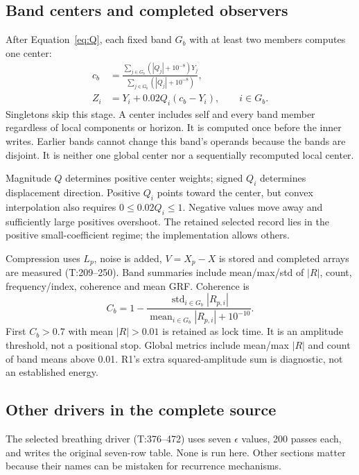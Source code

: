 \documentclass[11pt,a4paper]{article}
\newcommand{\src}[2]{\textsf{#1:#2}}
\newcommand{\mean}{\operatorname{mean}}
\newcommand{\sd}{\operatorname{std}}
\begin{document}
\subsection{Band centers and completed observers}
After Equation~\eqref{eq:Q}, each fixed band \(G_b\) with at least two members computes one center:
\begin{align}
c_b&=\frac{\sum_{j\in G_b}(|Q_j|+10^{-8})Y_j}
          {\sum_{j\in G_b}(|Q_j|+10^{-8})},\label{eq:Tcenter}\\
Z_i&=Y_i+0.02Q_i(c_b-Y_i),\qquad i\in G_b.\label{eq:Tfusion}
\end{align}
Singletons skip this stage. A center includes self and every band member regardless of local components or horizon. It is computed once before the inner writes. Earlier bands cannot change this band's operands because the bands are disjoint. It is neither one global center nor a sequentially recomputed local center.

Magnitude \(Q\) determines positive center weights; signed \(Q_i\) determines displacement direction. Positive \(Q_i\) points toward the center, but convex interpolation also requires \(0\le0.02Q_i\le1\). Negative values move away and sufficiently large positives overshoot. The retained selected record lies in the positive small-coefficient regime; the implementation allows others.

Compression uses \(L_p\), noise is added, \(V=X_p-X\) is stored and completed arrays are measured (\src{T}{209--250}). Band summaries include mean/max/std of \(|R|\), count, frequency/index, coherence and mean GRF. Coherence is
\begin{equation}\label{eq:lock}
C_b=1-\frac{\sd_{i\in G_b}|R_{p,i}|}
              {\mean_{i\in G_b}|R_{p,i}|+10^{-10}}.
\end{equation}
First \(C_b>0.7\) with mean \(|R|>0.01\) is retained as lock time. It is an amplitude threshold, not a positional stop. Global metrics include mean/max \(|R|\) and count of band means above 0.01. R1's extra squared-amplitude sum is diagnostic, not an established energy.

\subsection{Other drivers in the complete source}
The selected breathing driver (\src{T}{376--472}) uses seven \(\epsilon\) values, 200 passes each, and writes the original seven-row table. None is run here. Other sections matter because their names can be mistaken for recurrence mechanisms.
\end{document}
